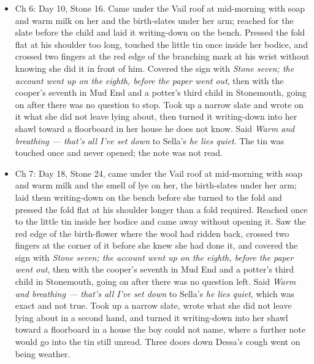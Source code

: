 \documentclass{design/chronicle}
\begin{document}
{\begin{itemize}[leftmargin=1.4em,itemsep=1pt,topsep=3pt,parsep=0pt]
\end{itemize}

\begin{itemize}[leftmargin=1.4em,itemsep=1pt,topsep=3pt,parsep=0pt]

\item Ch 6: Day 10, Stone 16. Came under the Vail roof at mid-morning with soap and warm milk on her and the birth-slates under her arm; reached for the slate before the child and laid it writing-down on the bench. Pressed the fold flat at his shoulder too long, touched the little tin once inside her bodice, and crossed two fingers at the red edge of the branching mark at his wrist without knowing she did it in front of him. Covered the sign with \emph{Stone seven; the account went up on the eighth, before the paper went out}, then with the cooper’s seventh in Mud End and a potter’s third child in Stonemouth, going on after there was no question to stop. Took up a narrow slate and wrote on it what she did not leave lying about, then turned it writing-down into her shawl toward a floorboard in her house he does not know. Said \emph{Warm and breathing --- that’s all I’ve set down} to Sella’s \emph{he lies quiet}. The tin was touched once and never opened; the note was not read.

\end{itemize}

\begin{itemize}[leftmargin=1.4em,itemsep=1pt,topsep=3pt,parsep=0pt]

\item Ch 7: Day 18, Stone 24, came under the Vail roof at mid-morning with soap and warm milk and the smell of lye on her, the birth-slates under her arm; laid them writing-down on the bench before she turned to the fold and pressed the fold flat at his shoulder longer than a fold required. Reached once to the little tin inside her bodice and came away without opening it. Saw the red edge of the birth-flower where the wool had ridden back, crossed two fingers at the corner of it before she knew she had done it, and covered the sign with \emph{Stone seven; the account went up on the eighth, before the paper went out}, then with the cooper’s seventh in Mud End and a potter’s third child in Stonemouth, going on after there was no question left. Said \emph{Warm and breathing --- that’s all I’ve set down} to Sella’s \emph{he lies quiet}, which was exact and not true. Took up a narrow slate, wrote what she did not leave lying about in a second hand, and turned it writing-down into her shawl toward a floorboard in a house the boy could not name, where a further note would go into the tin still unread. Three doors down Dessa’s cough went on being weather.


\end{itemize}}
\end{document}

